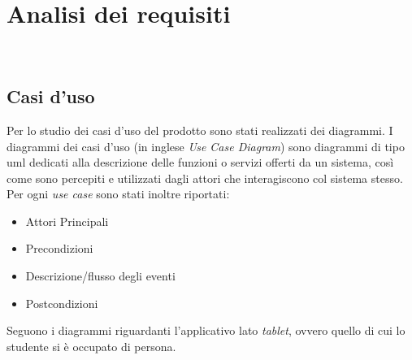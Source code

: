 \chapter{Analisi dei requisiti}
\label{cap:analisi-requisiti}

\\

\section{Casi d'uso}

Per lo studio dei casi d'uso del prodotto sono stati realizzati dei diagrammi.
I diagrammi dei casi d'uso (in inglese \emph{Use Case Diagram}) sono diagrammi di tipo \gls{uml} dedicati alla descrizione delle funzioni o servizi offerti da un sistema, così come sono percepiti e utilizzati dagli attori che interagiscono col sistema stesso.
Per ogni \emph{use case} sono stati inoltre riportati:
\begin{itemize}
	\item Attori Principali
	\item Precondizioni
	\item Descrizione/flusso degli eventi
	\item Postcondizioni
\end{itemize}
Seguono i diagrammi riguardanti l'applicativo lato \emph{tablet}, ovvero quello di cui lo studente si è occupato di persona.


